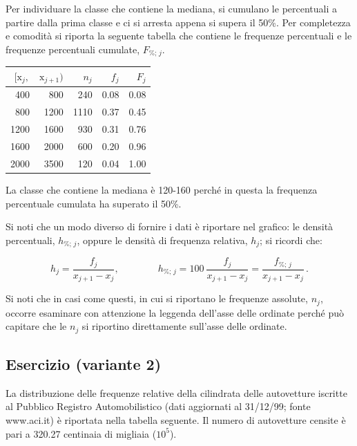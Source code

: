 \documentclass[
  11pt,
]{book}
\theoremstyle{mytheoremstyle}
\theoremstyle{mydefstyle}
\newenvironment{sol}
  {
  \begin{tcolorbox}[enhanced,breakable,arc=0.1mm,boxrule=1pt,colback=white,colframe=iblue,
  title=\bf \fontfamily{lmss}\selectfont \hspace{.5 cm} Soluzione,drop fuzzy shadow]

}{
\end{tcolorbox}
  }
\begin{document}
\begin{sol}
Per individuare la classe che contiene la mediana,
si cumulano le percentuali a partire dalla prima
classe e ci si arresta appena si supera il 50\%.
Per completezza e comodità si riporta la seguente
tabella che contiene le frequenze percentuali e le
frequenze percentuali cumulate, \(F_{\%;\, j}\).

\begin{tabular}{rrrrr}
\toprule
$[\text{x}_j,$ & $\text{x}_{j+1})$ & $n_j$ & $f_j$ & $F_j$\\
\midrule
400 & 800 & 240 & 0.08 & 0.08\\
800 & 1200 & 1110 & 0.37 & 0.45\\
1200 & 1600 & 930 & 0.31 & 0.76\\
1600 & 2000 & 600 & 0.20 & 0.96\\
2000 & 3500 & 120 & 0.04 & 1.00\\
\bottomrule
\end{tabular}

La classe che contiene la mediana è 120-160 perché in questa
la frequenza percentuale cumulata ha superato il 50\%.

Si noti che un modo diverso di fornire i dati è riportare
nel grafico: le densità percentuali, \(h_{\%;\, j}\), oppure
le densità di frequenza relativa, \(h_{j}\); si ricordi che:

\begin{displaymath}
h_{j}       = \frac{f_{j}}  {x_{j+1} - x_{j}},  \qquad\qquad
h_{\%;\, j} = 100\ \frac{f_{j}}  {x_{j+1} - x_{j}}
            = \frac{f_{\%;\, j}} {x_{j+1} - x_{j}}\, .
\end{displaymath}

Si noti che in casi come questi, in cui si riportano le
frequenze assolute, \(n_{j}\), occorre esaminare con attenzione
la leggenda dell'asse delle ordinate perché può capitare
che le \(n_{j}\) si riportino direttamente sull'asse delle
ordinate.

\end{sol}

\subsection{Esercizio (variante 2)}\label{esercizio-variante-2}

La distribuzione delle frequenze relative della cilindrata
delle autovetture iscritte al Pubblico Registro Automobilistico
(dati aggiornati al 31/12/99; fonte www.aci.it) è riportata
nella tabella seguente.
Il numero di autovetture censite è pari a 320.27 centinaia
di migliaia (\(10^{5}\)).
\end{document}
